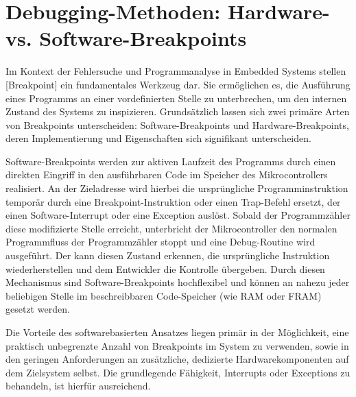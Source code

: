 
\newpage
\section{Debugging-Methoden: Hardware- vs. Software-Breakpoints}
\label{Hardware_VS_Software_Breakpoints}

Im Kontext der Fehlersuche und Programmanalyse in Embedded Systems stellen [Breakpoint] ein fundamentales Werkzeug dar. Sie erm\"oglichen es, die Ausf\"uhrung eines Programms an einer vordefinierten Stelle zu unterbrechen, um den internen Zustand des Systems zu inspizieren. Grunds\"atzlich lassen sich zwei prim\"are Arten von Breakpoints unterscheiden: Software-Breakpoints und Hardware-Breakpoints, deren Implementierung und Eigenschaften sich signifikant unterscheiden.

Software-Breakpoints werden zur aktiven Laufzeit des Programms durch einen direkten Eingriff in den ausf\"uhrbaren Code im Speicher des Mikrocontrollers realisiert. An der Zieladresse wird hierbei die urspr\"ungliche Programminstruktion tempor\"ar durch eine Breakpoint-Instruktion oder einen Trap-Befehl ersetzt, der einen Software-Interrupt oder eine Exception ausl\"ost. Sobald der Programmz\"ahler diese modifizierte Stelle erreicht, unterbricht der Mikrocontroller den normalen Programmfluss der Programmz\"ahler stoppt und eine Debug-Routine wird ausgef\"uhrt. Der  kann diesen Zustand erkennen, die urspr\"ungliche Instruktion wiederherstellen und dem Entwickler die Kontrolle \"ubergeben. Durch diesen Mechanismus sind Software-Breakpoints hochflexibel und k\"onnen an nahezu jeder beliebigen Stelle im beschreibbaren Code-Speicher (wie RAM oder FRAM) gesetzt werden.

Die Vorteile des softwarebasierten Ansatzes liegen prim\"ar in der M\"oglichkeit, eine praktisch unbegrenzte Anzahl von Breakpoints im System zu verwenden, sowie in den geringen Anforderungen an zus\"atzliche, dedizierte Hardwarekomponenten auf dem Zielsystem selbst. Die grundlegende F\"ahigkeit, Interrupts oder Exceptions zu behandeln, ist hierf\"ur ausreichend. 

